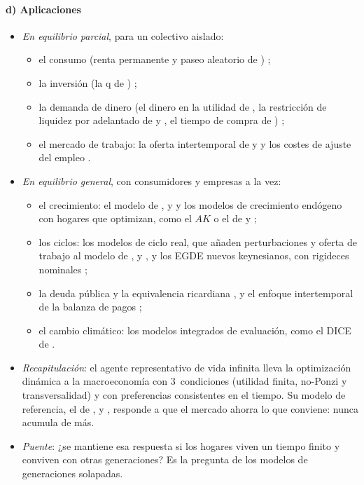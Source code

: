 \documentclass[11pt]{article}
\begin{document}
\paragraph{d) Aplicaciones}

\begin{itemize}
\item \emph{En equilibrio parcial}, para un colectivo aislado:
  \begin{itemize}
  \item el consumo (renta permanente y paseo aleatorio de ) ;
  \item la inversión (la q de ) ;
  \item la demanda de dinero (el dinero en la utilidad de , la restricción de liquidez por adelantado de  y , el tiempo de compra de ) ;
  \item el mercado de trabajo: la oferta intertemporal de  y   y los costes de ajuste del empleo\nocite{BentolilaBertola1990Firing,Hamermesh1993Labor} .
  \end{itemize}
\item \emph{En equilibrio general}, con consumidores y empresas a la vez:
  \begin{itemize}
  \item el crecimiento: el modelo de ,  y   y los modelos de crecimiento endógeno con hogares que optimizan, como el $AK$ o el de  y  ;
  \item los ciclos: los modelos de ciclo real, que añaden perturbaciones y oferta de trabajo al modelo de ,  y  , y los EGDE nuevos keynesianos, con rigideces nominales ;
  \item la deuda pública y la equivalencia ricardiana , y el enfoque intertemporal de la balanza de pagos ;
  \item el cambio climático: los modelos integrados de evaluación, como el DICE de \textcite{Nordhaus1992Optimal} .
  \end{itemize}
\end{itemize}

\begin{itemize}
\item \emph{Recapitulación}: el agente representativo de vida infinita lleva la optimización dinámica a la macroeconomía con 3~condiciones (utilidad finita, no-Ponzi y transversalidad) y con preferencias consistentes en el tiempo. Su modelo de referencia, el de ,  y , responde a  que el mercado ahorra lo que conviene: nunca acumula de más.
\item \emph{Puente}: ¿se mantiene esa respuesta si los hogares viven un tiempo finito y conviven con otras generaciones? Es la pregunta de los modelos de generaciones solapadas.
\end{itemize}
\end{document}
